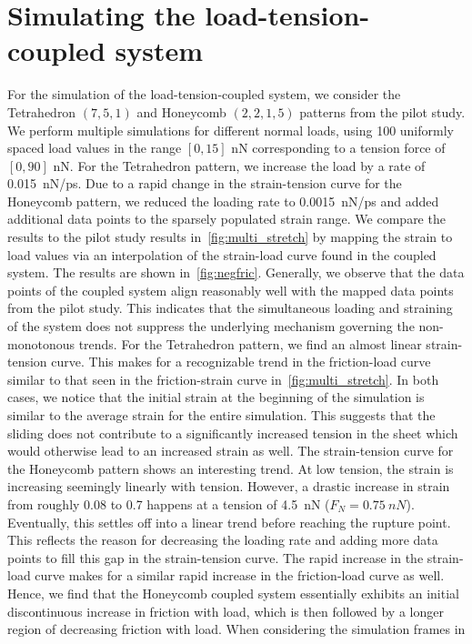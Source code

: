 \section{Simulating the load-tension-coupled system}
For the simulation of the load-tension-coupled system, we consider the Tetrahedron $(7,5,1)$ and Honeycomb $(2,2,1,5)$ patterns from the pilot study. We perform multiple simulations for different normal loads, using 100 uniformly spaced load values in the range $[0, 15]$ nN corresponding to a tension force of $[0, 90]$ nN. For the Tetrahedron pattern, we increase the load by a rate of \SI{0.015}{nN/ps}. Due to a rapid change in the strain-tension curve for the Honeycomb pattern, we reduced the loading rate to \SI{0.0015}{nN/ps} and added additional data points to the sparsely populated strain range. We compare the results to the pilot study results in~\cref{fig:multi_stretch} by mapping the strain to load values via an interpolation of the strain-load curve found in the coupled system. The results are shown in~\cref{fig:negfric}. Generally, we observe that the data points of the
coupled system align reasonably well with the mapped data points from the pilot
study. This indicates that the simultaneous loading and straining of the system
does not suppress the underlying mechanism governing the non-monotonous trends. For the Tetrahedron pattern, we find an almost linear strain-tension curve. This makes for a recognizable trend in the friction-load curve similar to that seen
in the friction-strain curve in~\cref{fig:multi_stretch}. In both cases, we notice that the initial strain at the beginning of the simulation is similar to the average strain for the entire simulation. This
suggests that the sliding does not contribute to a significantly increased
tension in the sheet which would otherwise lead to an increased strain as well. The strain-tension curve for the Honeycomb pattern shows an interesting trend. At low tension, the strain is increasing seemingly linearly with tension. However, a drastic increase in strain from roughly 0.08 to 0.7 happens at a tension of \SI{4.5}{nN} ($F_N = \SI{0.75}{nN}$). Eventually, this settles off into a linear trend before reaching the rupture point. This
reflects the reason for decreasing the loading rate and adding more data points
to fill this gap in the strain-tension curve. The rapid increase in the strain-load curve makes for a similar rapid increase in the friction-load curve as well.
Hence, we find that the Honeycomb coupled system essentially exhibits an initial discontinuous increase in friction with load, which is then followed by a longer region of decreasing friction with load. When considering the simulation frames in
